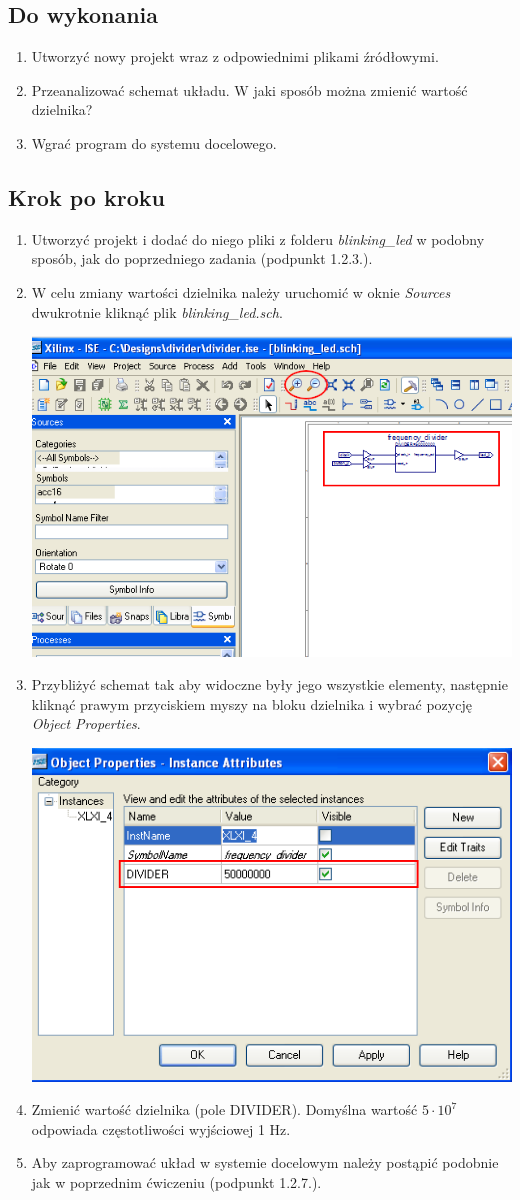 \documentclass[12pt]{article}
\begin{document}
\subsection{Do wykonania}
\begin{enumerate}[wide, labelwidth=!, labelindent=0pt]	
\item Utworzyć nowy projekt wraz z odpowiednimi plikami źródłowymi.
\item Przeanalizować schemat układu. W jaki sposób można zmienić wartość dzielnika?
\item Wgrać program do systemu docelowego.
\end{enumerate}
\subsection{Krok po kroku}
\begin{enumerate}[wide, labelwidth=!, labelindent=0pt]	
\item Utworzyć projekt i dodać do niego pliki z folderu \textit{blinking\_led} w podobny sposób, jak do poprzedniego zadania (podpunkt 1.2.3.).
\item W celu zmiany wartości dzielnika należy uruchomić w oknie \textit{Sources} dwukrotnie kliknąć plik \textit{blinking\_led.sch}.\\
\centerline{\includegraphics[width=0.5\linewidth]{2_1.png}}
\item Przybliżyć schemat tak aby widoczne były jego wszystkie elementy, następnie kliknąć prawym przyciskiem myszy na bloku dzielnika i wybrać pozycję \textit{Object Properties}.\\
\centerline{\includegraphics[width=0.5\linewidth]{2_2.png}}
\item Zmienić wartość dzielnika (pole DIVIDER). Domyślna wartość $5\cdot 10^{7}$ odpowiada częstotliwości wyjściowej 1 Hz.
\item Aby zaprogramować układ w systemie docelowym należy postąpić podobnie jak w poprzednim ćwiczeniu (podpunkt 1.2.7.).
\end{enumerate}
\end{document}
